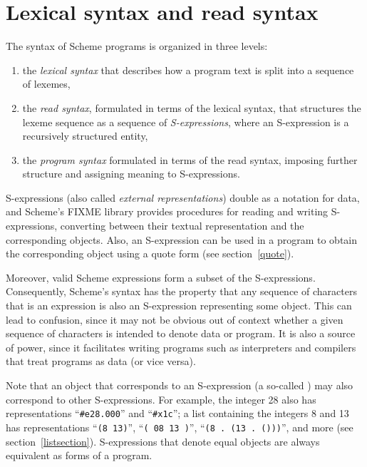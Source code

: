 
\chapter{Lexical syntax and read syntax}
\label{readsyntaxchapter}

The syntax of Scheme programs is organized in three levels:
%
\begin{enumerate}
\item the \textit{lexical syntax} that describes how a program text is split
  into a sequence of lexemes,
\item the \textit{read syntax}, formulated in terms of the lexical
  syntax, that structures the lexeme sequence as a sequence of
  \textit{S-expressions}, where an S-expression is
    a recursively structured entity,
\item the \textit{program syntax} formulated in terms of the read
  syntax, imposing further structure and assigning meaning to
  S-expressions.
\end{enumerate}
%
S-expressions (also called \textit{external
  representations}) double
as a notation for data, and Scheme's FIXME library provides procedures
for reading and writing S-expressions, converting between their
textual representation and the corresponding objects.  Also, an
S-expression can be used in a program to obtain the corresponding
object using a {\cf quote} form (see section~\ref{quote}).

Moreover, valid Scheme expressions form a subset of the S-expressions.
Consequently, Scheme's syntax has the property that any sequence of
characters that is an expression is also an S-expression representing
some object.  This can lead to confusion, since it may not be obvious
out of context whether a given sequence of characters is intended to
denote data or program. It is also a source of power, since it
facilitates writing programs such as interpreters and compilers that
treat programs as data (or vice versa).

Note that an object that corresponds to an S-expression (a so-called
) may also correspond to other S-expressions.  For example, the
integer 28 also has representations ``{\tt \#e28.000}'' and
``{\tt\#x1c}''; a list containing the integers 8 and 13 has representations
 ``{\tt(8 13)}'', ``{\tt( 08 13 )}'', ``{\tt(8 .\ (13 .\ ()))}'', and more (see
section~\ref{listsection}).  S-expressions that denote equal
objects are always equivalent as forms of a program.

